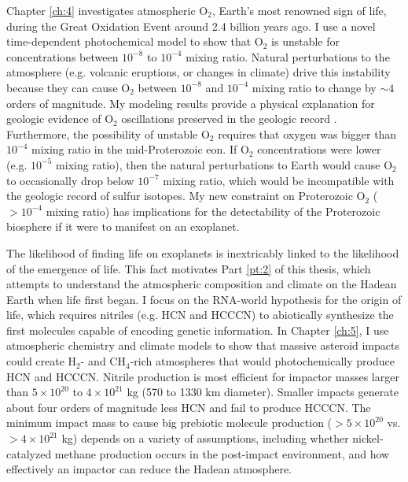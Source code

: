 Chapter \ref{ch:4} investigates atmospheric O$_2$, Earth's most renowned sign of life, during the Great Oxidation Event around 2.4 billion years ago. I use a novel time-dependent photochemical model to show that O$_2$ is unstable for concentrations between $10^{-8}$ to $10^{-4}$ mixing ratio. Natural perturbations to the atmosphere (e.g. volcanic eruptions, or changes in climate) drive this instability because they can cause O$_2$ between $10^{-8}$ and $10^{-4}$ mixing ratio to change by $\sim 4$ orders of magnitude. My modeling results provide a physical explanation for geologic evidence of O$_2$ oscillations preserved in the geologic record \citep{Poulton_2021}. Furthermore, the possibility of unstable O$_2$ requires that oxygen was bigger than $10^{-4}$ mixing ratio in the mid-Proterozoic eon. If O$_2$ concentrations were lower (e.g. $10^{-5}$ mixing ratio), then the natural perturbations to Earth would cause O$_2$ to occasionally drop below $10^{-7}$ mixing ratio, which would be incompatible with the geologic record of sulfur isotopes. My new constraint on Proterozoic O$_2$ ($> 10^{-4}$ mixing ratio) has implications for the detectability of the Proterozoic biosphere if it were to manifest on an exoplanet.

The likelihood of finding life on exoplanets is inextricably linked to the likelihood of the emergence of life. This fact motivates Part \ref{pt:2} of this thesis, which attempts to understand the atmospheric composition and climate on the Hadean Earth when life first began. I focus on the RNA-world hypothesis for the origin of life, which requires nitriles (e.g. HCN and HCCCN) to abiotically synthesize the first molecules capable of encoding genetic information. In Chapter \ref{ch:5}, I use atmospheric chemistry and climate models to show that massive asteroid impacts could create H$_2$- and CH$_4$-rich atmospheres that would photochemically produce HCN and HCCCN. Nitrile production is most efficient for impactor masses larger than $5 \times 10^{20}$ to $4 \times 10^{21}$ kg (570 to 1330 km diameter). Smaller impacts generate about four orders of magnitude less HCN and fail to produce HCCCN. The minimum impact mass to cause big prebiotic molecule production ($> 5 \times 10^{20}$ vs. $> 4 \times 10^{21}$ kg) depends on a variety of assumptions, including whether nickel-catalyzed methane production occurs in the post-impact environment, and how effectively an impactor can reduce the Hadean atmosphere.

